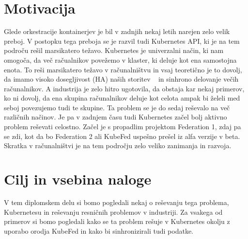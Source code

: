 \documentclass[a4paper, 12pt]{book}
\begin{document}
\section{Motivacija}
Glede orkestracije kontainerjev je bil v zadnjih nekaj letih narejen zelo velik preboj. 
V postopku tega preboja se je razvil tudi Kubernetes API, ki je na tem področu rešil marsikatero težavo.
Kubernetes  je univerzalni način, ki nam omogoča, da več račualnikov povežemo v klaster, ki deluje kot ena samostojna enota. 
To reši marsikatero težavo v računalništvu in vsaj teoretično je to dovolj, da imamo visoko dosegljivost (HA) naših storitev ~\cite{mastering-Kubernetes} in sinhrono delovanje večih računalnikov.
A industrija je zelo hitro ugotovila, da obstaja kar nekaj primerov, ko ni dovolj, da ena skupina računalnikov deluje kot celota ampak bi želeli med seboj povezujemo tudi te skupine.
Ta problem se je do sedaj reševalo na več različnih načinov.
Je pa v zadnjem času tudi Kubernetes začel bolj aktivno problem reševati celostno.
Začel je s propadlim projektom Federation 1, zdaj pa se zdi, kot da bo Federation 2 ali KubeFed uspešno prešel iz alfa verzije v beta.
Skratka v računalništvi je na tem področju zelo veliko zanimanja in razvoja.
\section{Cilj in vsebina naloge}
V tem diplomskem delu si bomo pogledali nekaj o reševanju tega problema, Kubernetesu in reševanju resničnih problemov v industriji. 
Za vsakega od primerov si bomo pogledali kako se ta problem rešuje v Kubernetes okolju z uporabo orodja KubeFed in kako bi sinhronizirali tudi podatke.
\end{document}

